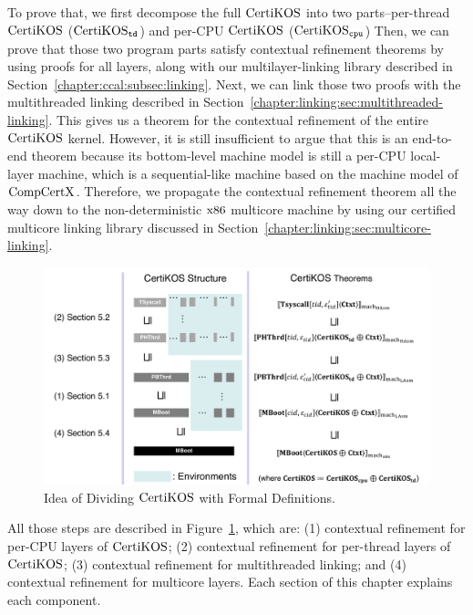 To  prove that, we first decompose the full $\mathrm{CertiKOS}$ into two parts--per-thread $\mathrm{CertiKOS}$ ($\mathrm{CertiKOS}_{{\mathrm{\texttt{td}}}}$) and per-CPU $\mathrm{CertiKOS}$ ($\mathrm{CertiKOS}_{{\mathrm{\texttt{cpu}}}}$)
Then, we can prove that those two program parts satisfy contextual refinement theorems by using proofs for all layers,
along with our multilayer-linking library described in Section~\ref{chapter:ccal:subsec:linking}. 
Next, we can link those two proofs with the multithreaded linking described in Section~\ref{chapter:linking:sec:multithreaded-linking}. 
This gives us a theorem for the contextual refinement of the entire $\mathrm{CertiKOS}$ kernel. 
However, it is still insufficient to argue that this is an end-to-end theorem because its bottom-level machine model is still a per-CPU local-layer machine, 
which is a sequential-like machine based on the machine model of 
$\mathrm{CompCertX}$.  %
 Therefore, we propagate the contextual refinement theorem all the way down to the non-deterministic $\mathrm{x86}$ 
 multicore machine by using our certified multicore linking library discussed in Section~\ref{chapter:linking:sec:multicore-linking}.
\begin{figure}
\includegraphics[width=\textwidth, page=1]{figs/certikos/concurrent_linking}
\caption{Idea of Dividing $\mathrm{CertiKOS}$ with Formal Definitions.} 
\label{fig:chapter:certikos:idea-of-dividing-certikos-with-formal-def}
\end{figure}
All those steps are described in Figure~\ref{fig:chapter:certikos:idea-of-dividing-certikos-with-formal-def},
which are: (1) contextual refinement for per-CPU layers of $\mathrm{CertiKOS}$; (2) contextual refinement for per-thread layers of $\mathrm{CertiKOS}$;
(3) contextual refinement for multithreaded linking;  and (4) contextual refinement for multicore layers.
Each section of this chapter explains each  component.
%
